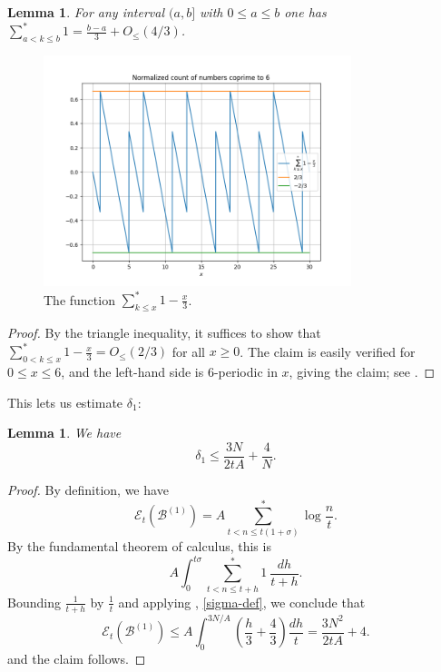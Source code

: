 \documentclass[12pt,a4paper,reqno]{amsart}
\numberwithin{equation}{section}
\theoremstyle{plain}
\newtheorem{lemma}[theorem]{Lemma}
\theoremstyle{definition}
\newcommand\tuple{{\mathcal B}}
\newcommand\excess{{\mathcal{E}}}
\begin{document}
\begin{lemma}\label{lit}  For any interval $(a,b]$ with $0 \leq a \leq b$ one has $\sum_{a < k \leq b}^* 1 = \frac{b-a}{3} + O_{\leq}(4/3)$.
\end{lemma}

\begin{figure}
  \centering
  \includegraphics[width=0.8\textwidth]{sawtooth.png}
  \caption{The function $\sum_{k \leq x}^* 1 - \frac{x}{3}$.}\label{fig-saw}
\end{figure}

\begin{proof}  By the triangle inequality, it suffices to show that $\sum_{0 < k \leq x}^* 1 - \frac{x}{3} = O_{\leq}(2/3)$ for all $x \geq 0$.  The claim is easily verified for $0 \leq x \leq 6$, and the left-hand side is $6$-periodic in $x$, giving the claim; see .
\end{proof}

This lets us estimate $\delta_1$:

\begin{lemma}\label{delta1-bound} We have
$$ \delta_1 \leq \frac{3N}{2tA} + \frac{4}{N}.$$
\end{lemma}

\begin{proof}  By definition, we have
$$ \excess_t(\tuple^{(1)}) = A \sum^*_{t < n \leq t(1+\sigma)} \log \frac{n}{t}.$$
By the fundamental theorem of calculus, this is
$$ A \int_0^{t\sigma} \sum^*_{t < n \leq t+h} 1\ \frac{dh}{t+h}.$$
Bounding $\frac{1}{t+h}$ by $\frac{1}{t}$ and applying , \eqref{sigma-def}, we conclude that
$$
 \excess_t(\tuple^{(1)}) \leq A \int_0^{3N/A} \left(\frac{h}{3} + \frac{4}{3}\right) \frac{dh}{t} = \frac{3N^2}{2tA} + 4.
$$
and the claim follows.
\end{proof}
\end{document}
